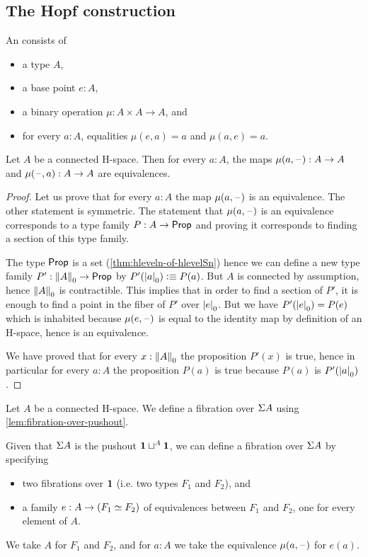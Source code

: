 \subsection{The Hopf construction}

\begin{defn}
  An 
  consists of
  \begin{itemize}
  \item a type $A$,
  \item a base point $e:A$,
  \item a binary operation $\mu:A\times A\to A$, and
  \item for every $a:A$, equalities $\mu(e,a)=a$ and $\mu(a,e)=a$.
  \end{itemize}
\end{defn}

\begin{lem}
  Let $A$ be a connected H-space. Then for every $a:A$, the maps $\mu(a,\blank):A\to
  A$ and $\mu(\blank,a):A\to A$ are equivalences.
\end{lem}

\begin{proof}
  Let us prove that for every $a:A$ the map $\mu(a,\blank)$ is an equivalence. The
  other statement is symmetric.
  The statement that $\mu(a,\blank)$ is an equivalence corresponds to a type family
  $P:A\to\prop$ and proving it corresponds to finding a section of this type
  family.

  The type $\prop$ is a set (\cref{thm:hleveln-of-hlevelSn}) hence we can
  define a new type family $P':\trunc0A\to\prop$ by $P'(\tproj0a)\defeq
  P(a)$. But $A$ is connected by assumption, hence $\trunc0A$ is
  contractible. This implies that in order to find a section of $P'$, it is
  enough to find a point in the fiber of $P'$ over $\tproj0e$. But we have
  $P'(\tproj0e)=P(e)$ which is inhabited because $\mu(e,\blank)$ is equal to the
  identity map by definition of an H-space, hence is an equivalence.

  We have proved that for every $x:\trunc0A$ the proposition $P'(x)$ is true,
  hence in particular for every $a:A$ the proposition $P(a)$ is true because
  $P(a)$ is $P'(\tproj0a)$.
\end{proof}

\begin{defn}
  Let $A$ be a connected H-space. We define a fibration over $\susp A$ using
  \cref{lem:fibration-over-pushout}.

  Given that $\susp A$ is the pushout $\unit\sqcup^A\unit$, we can define a
  fibration over $\susp A$ by specifying
  \begin{itemize}
  \item two fibrations over $\unit$ (i.e. two types $F_1$ and $F_2$), and
  \item a family $e:A\to(\eqv{F_1}{F_2})$ of equivalences between
    $F_1$ and $F_2$, one for every element of $A$.
  \end{itemize}
  We take $A$ for $F_1$ and $F_2$, and for $a:A$ we take the equivalence
  $\mu(a,\blank)$ for $e(a)$.
\end{defn}

